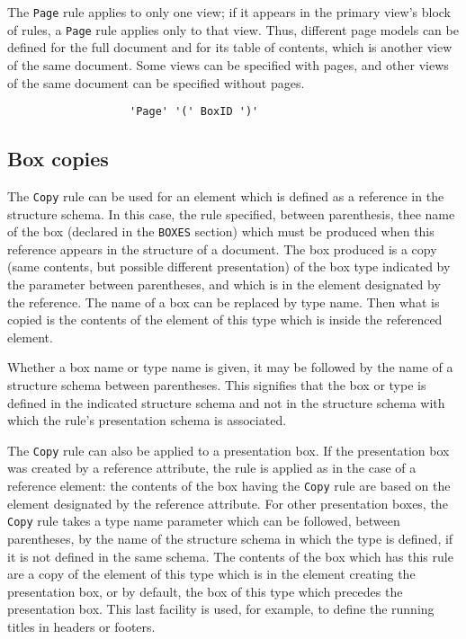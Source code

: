 The {\tt Page} rule applies to only one view; if it appears in the
primary view's block of rules, a {\tt Page} rule applies only to that
view.  Thus, different page models
can be defined for the full document and for its table of contents,
which is another view of the same document.
Some views can be specified with pages, and other views of the same document
can be specified without pages.

\begin{verbatim}
                   'Page' '(' BoxID ')'
\end{verbatim}

\subsection{Box copies}
\label{regleCopy}

The {\tt Copy} rule can be used for an element which is defined as a
reference in the structure schema.  In this case, the rule specified,
between parenthesis, thee name of the box (declared in the {\tt BOXES}
section) which must be produced when this reference appears in the
structure of a document.  The box produced is a copy (same contents,
but possible different presentation) of the box type indicated by the
parameter between parentheses, and which is in the element designated
by the reference.  The name of a box can be replaced by type name.
Then what is copied is the contents of the element of this type which
is inside the referenced element.

Whether a box name or type name is given, it may be followed by the
name of a structure schema between parentheses.  This signifies that
the box or type is defined in the indicated structure schema and not
in the structure schema with which the rule's presentation schema is
associated.

The {\tt Copy} rule can also be applied to a presentation box.  If the
presentation box was created by a reference attribute, the rule is
applied as in the case of a reference element: the contents of the box
having the {\tt Copy} rule are based on the element designated by the
reference attribute.  For other presentation boxes, the {\tt Copy} rule takes a
type name parameter which can be followed, between parentheses, by the
name of the structure schema in which the type is defined, if it is
not defined in the same schema.  The contents of the box which has
this rule are a copy of the element of this type which is in the
element creating the presentation box, or by default, the box of this
type which precedes the presentation box.  This last facility is used,
for example, to define the running titles in headers or footers.

